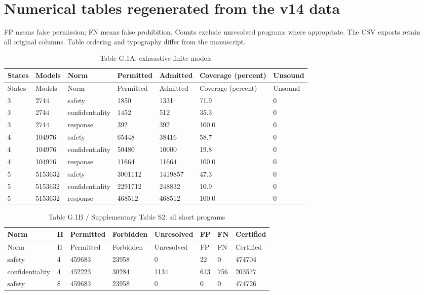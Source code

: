 \documentclass[10pt]{article}
\begin{document}
\section*{Numerical tables regenerated from the v14 data}
FP means false permission; FN means false prohibition. Counts exclude unresolved programs where appropriate.
The CSV exports retain all original columns. Table ordering and typography differ from the manuscript.
\begin{landscape}\scriptsize\setlength{\tabcolsep}{3pt}
\begin{longtable}{lllllll}
\caption{Table G.1A: exhaustive finite models}\\
\toprule
States & Models & Norm & Permitted & Admitted & Coverage (percent) & Unsound\\\midrule\endfirsthead
\toprule States & Models & Norm & Permitted & Admitted & Coverage (percent) & Unsound\\\midrule\endhead
3 & 2744 & safety & 1850 & 1331 & 71.9 & 0\\
3 & 2744 & confidentiality & 1452 & 512 & 35.3 & 0\\
3 & 2744 & response & 392 & 392 & 100.0 & 0\\
4 & 104976 & safety & 65448 & 38416 & 58.7 & 0\\
4 & 104976 & confidentiality & 50480 & 10000 & 19.8 & 0\\
4 & 104976 & response & 11664 & 11664 & 100.0 & 0\\
5 & 5153632 & safety & 3001112 & 1419857 & 47.3 & 0\\
5 & 5153632 & confidentiality & 2291712 & 248832 & 10.9 & 0\\
5 & 5153632 & response & 468512 & 468512 & 100.0 & 0\\
\bottomrule\end{longtable}
\clearpage
\begin{longtable}{llllllll}
\caption{Table G.1B / Supplementary Table S2: all short programs}\\
\toprule
Norm & H & Permitted & Forbidden & Unresolved & FP & FN & Certified\\\midrule\endfirsthead
\toprule Norm & H & Permitted & Forbidden & Unresolved & FP & FN & Certified\\\midrule\endhead
safety & 4 & 459683 & 23958 & 0 & 22 & 0 & 474704\\
confidentiality & 4 & 452223 & 30284 & 1134 & 613 & 756 & 203577\\
safety & 8 & 459683 & 23958 & 0 & 0 & 0 & 474726\\

\end{longtable}
\end{landscape}
\end{document}

